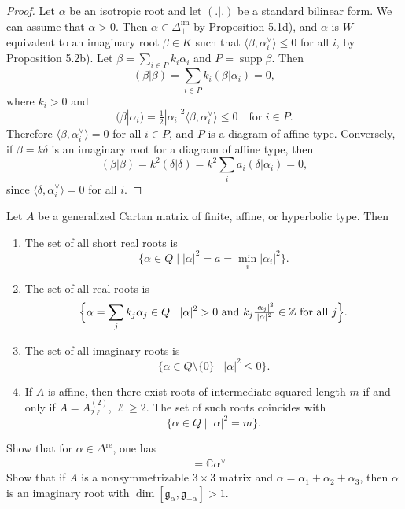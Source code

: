 \documentclass[12pt]{article}
\begin{document}
\begin{proof}
    Let $\alpha$ be an isotropic root and let $(.|.)$ be a standard bilinear form.
    We can assume that $\alpha>0$. Then $\alpha \in \Delta^{\mathrm{im}}_+$ by
    Proposition 5.1d), and $\alpha$ is $W$-equivalent to an imaginary root
    $\beta \in K$ such that $\langle \beta,\alpha_i^\vee\rangle \leq 0$ for all $i$,
    by Proposition 5.2b). Let $\beta = \sum_{i\in P} k_i\alpha_i$ and
    $P=\operatorname{supp}\beta$. Then
    \[
        (\beta|\beta) = \sum_{i\in P} k_i(\beta|\alpha_i) = 0,
    \]
    where $k_i>0$ and
    \[
        (\beta|\alpha_i) = \tfrac{1}{2}|\alpha_i|^2 \langle \beta,\alpha_i^\vee \rangle
        \leq 0 \quad \text{for } i\in P.
    \]
    Therefore $\langle \beta,\alpha_i^\vee\rangle = 0$ for all $i\in P$, and $P$ is a
    diagram of affine type. Conversely, if $\beta = k\delta$ is an imaginary root for a
    diagram of affine type, then
    \[
        (\beta|\beta) = k^2(\delta|\delta) = k^2 \sum_i a_i(\delta|\alpha_i) = 0,
    \]
    since $\langle \delta,\alpha_i^\vee\rangle=0$ for all $i$.
\end{proof}

\begin{proposition}\label{prop:root-lengths}
Let $A$ be a generalized Cartan matrix of finite, affine, or hyperbolic type. Then

\begin{enumerate}[label=\alph*)]

\item The set of all short real roots is
\[
\{\alpha \in Q \mid |\alpha|^2 = a = \min_i |\alpha_i|^2 \}.
\]

\item The set of all real roots is
\[
\Bigl\{\alpha = \sum_j k_j \alpha_j \in Q \;\Big|\; 
|\alpha|^2 > 0 \ \text{and}\ k_j \tfrac{|\alpha_j|^2}{|\alpha|^2} \in \mathbb{Z}\ 
\text{for all $j$} \Bigr\}.
\]

\item The set of all imaginary roots is
\[
\{\alpha \in Q\setminus\{0\} \mid |\alpha|^2 \leq 0 \}.
\]

\item If $A$ is affine, then there exist roots of intermediate squared length $m$ if and only if 
$A = A_{2\ell}^{(2)}$, $\ell \geq 2$. The set of such roots coincides with
\[
\{\alpha \in Q \mid |\alpha|^2 = m \}.
\]
\end{enumerate}
\end{proposition}

\begin{exercise}
    Show that for $\alpha \in \Delta^{\mathrm{re}}$, one has \begin{align*}
        [\mathfrak{g}_\alpha, \mathfrak{g}_{-\alpha}] & = \mathbb{C}\alpha^\vee
    \end{align*}
    Show that if $A$ is a nonsymmetrizable $3\times 3$ matrix and $\alpha = \alpha_1 + \alpha_2 + \alpha_3$, then $\alpha$ is an imaginary root with $\dim [\mathfrak{g}_\alpha, \mathfrak{g}_{-\alpha}] > 1$.
\end{exercise}
\end{document}
